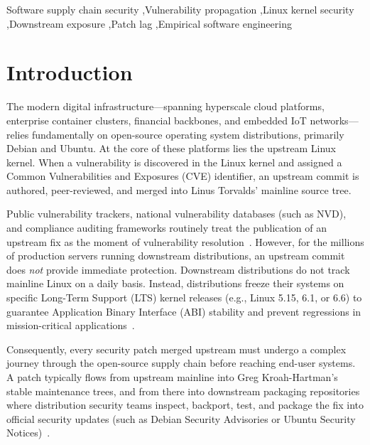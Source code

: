 \documentclass[final,5p,times,twocolumn]{elsarticle}
\begin{document}
\begin{frontmatter}
\begin{keyword}
Software supply chain security \sep Vulnerability propagation \sep Linux kernel security \sep Downstream exposure \sep Patch lag \sep Empirical software engineering
\end{keyword}

\end{frontmatter}

\section{Introduction}
\label{sec:intro}

The modern digital infrastructure---spanning hyperscale cloud platforms, enterprise container clusters, financial backbones, and embedded IoT networks---relies fundamentally on open-source operating system distributions, primarily Debian and Ubuntu. At the core of these platforms lies the upstream Linux kernel. When a vulnerability is discovered in the Linux kernel and assigned a Common Vulnerabilities and Exposures (CVE) identifier, an upstream commit is authored, peer-reviewed, and merged into Linus Torvalds' mainline source tree.

Public vulnerability trackers, national vulnerability databases (such as NVD), and compliance auditing frameworks routinely treat the publication of an upstream fix as the moment of vulnerability resolution~\citep{gkortzis2021software, decoster2022measuring}. However, for the millions of production servers running downstream distributions, an upstream commit does \textit{not} provide immediate protection. Downstream distributions do not track mainline Linux on a daily basis. Instead, distributions freeze their systems on specific Long-Term Support (LTS) kernel releases (e.g., Linux 5.15, 6.1, or 6.6) to guarantee Application Binary Interface (ABI) stability and prevent regressions in mission-critical applications~\citep{ruohonen2019tracking}.

Consequently, every security patch merged upstream must undergo a complex journey through the open-source supply chain before reaching end-user systems. A patch typically flows from upstream mainline into Greg Kroah-Hartman's stable maintenance trees, and from there into downstream packaging repositories where distribution security teams inspect, backport, test, and package the fix into official security updates (such as Debian Security Advisories or Ubuntu Security Notices)~\citep{wang2020empirical, han2023understanding}.
\end{document}
